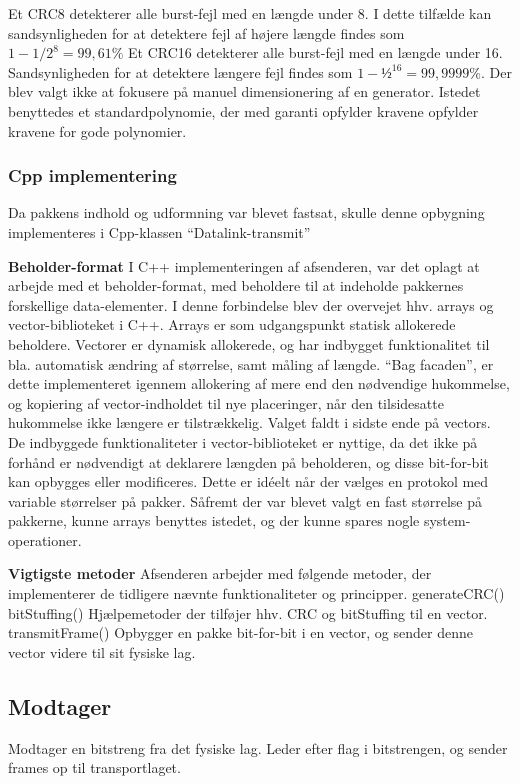 Et CRC8 detekterer alle burst-fejl med en længde under 8. I dette tilfælde kan sandsynligheden for at detektere fejl af højere længde findes som $1-1/2^8 = 99,61\%$
Et CRC16 detekterer alle burst-fejl med en længde under 16. Sandsynligheden for at detektere længere fejl findes som $1-½^16 = 99,9999\%.$
    Der blev valgt ikke at fokusere på manuel dimensionering af en generator. Istedet benyttedes et standardpolynomie, der med garanti opfylder kravene opfylder kravene for gode polynomier.

\subsubsection{Cpp implementering}
Da pakkens indhold og udformning var blevet fastsat, skulle denne opbygning implementeres i Cpp-klassen “Datalink-transmit”

\textbf{Beholder-format}
I C++ implementeringen af afsenderen, var det oplagt at arbejde med et beholder-format, med beholdere til at indeholde pakkernes forskellige data-elementer.
I denne forbindelse blev der overvejet hhv. arrays og vector-biblioteket i C++. 
Arrays er som udgangspunkt statisk allokerede beholdere.
Vectorer er dynamisk allokerede, og har indbygget funktionalitet til bla. automatisk ændring af størrelse, samt måling af længde. “Bag facaden”, er dette implementeret igennem allokering af mere end den nødvendige hukommelse, og kopiering af vector-indholdet til nye placeringer, når den tilsidesatte hukommelse ikke længere er tilstrækkelig. 
Valget faldt i sidste ende på vectors. De indbyggede funktionaliteter i vector-biblioteket er nyttige, da det ikke på forhånd er nødvendigt at deklarere længden på beholderen, og disse bit-for-bit kan opbygges eller modificeres. Dette er idéelt når der vælges en protokol med variable størrelser på pakker. Såfremt der var blevet valgt en fast størrelse på pakkerne, kunne arrays benyttes istedet, og der kunne spares nogle system-operationer.

\textbf{Vigtigste metoder}
Afsenderen arbejder med følgende metoder, der implementerer de tidligere nævnte funktionaliteter og principper.
generateCRC()
bitStuffing()
Hjælpemetoder der tilføjer hhv. CRC og bitStuffing til en vector.
transmitFrame()
Opbygger en pakke bit-for-bit i en vector, og sender denne vector videre til sit fysiske lag.


\subsection{Modtager}
Modtager en bitstreng fra det fysiske lag. Leder efter flag i bitstrengen, og sender frames op til transportlaget. 